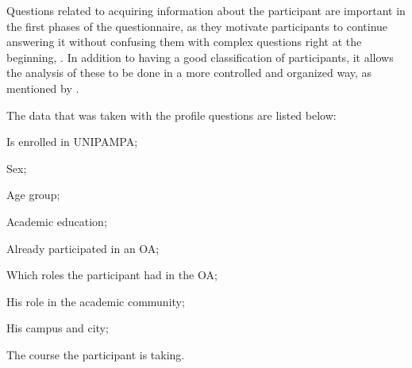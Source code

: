 Questions related to acquiring information about the participant are important in the first phases of the questionnaire, as they motivate participants to continue answering it without confusing them with complex questions right at the beginning, \cite{LMRea}.
In addition to having a good classification of participants, it allows the analysis of these to be done in a more controlled and organized way, as mentioned by .


The data that was taken with the profile questions are listed below:
\begin{inparaenum}[(1)]
  \item Is enrolled in \ac{UNIPAMPA};
  \item Sex;
  \item Age group;
  \item Academic education;
  \item Already participated in an \ac{OA};
  \item Which roles the participant had in the \ac{OA};
  \item His role in the academic community;
  \item His campus and city;
  \item The course the participant is taking.
\end{inparaenum}

